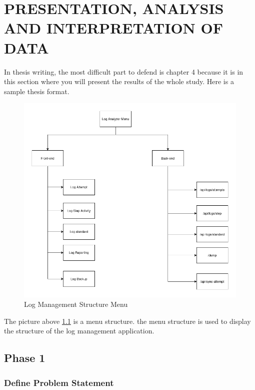 \chapter{PRESENTATION, ANALYSIS AND INTERPRETATION OF DATA}
In thesis writing, the most difficult part to defend is chapter 4 because it is in this section where you will present the results of the whole study. Here is a sample thesis format.
\begin{figure}[H] 
	\centering
	\includegraphics[width=14cm]{figure/structure menu.png}
	\caption{Log Management Structure Menu}
	\label{fig:structure-menu}
\end{figure}

The picture above \ref{fig:structure-menu} is a menu structure. the menu structure is used to display the structure of the log management application.
\section{Phase 1}

\subsection{Define Problem Statement}

